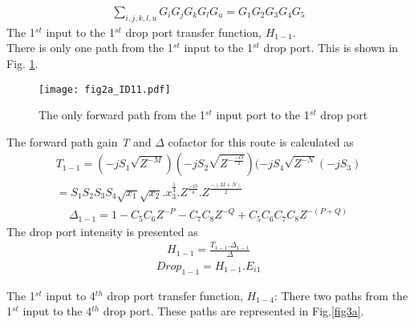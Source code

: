 \documentclass{osa-article}
\begin{document}
\begin{equation}
\begin{split}
\sum_{i,j,k,l,u} {G_i G_j G_kG_lG_u}=G_1G_2G_3G_4G_5 
\label{eqa46}
\end{split}
\end{equation}
The 1$^{st}$ input to the 1$^{st}$ drop port transfer function, $H_{1-1}$.\\

There is only one path from the 1$^{st}$ input to the 1$^{st}$ drop port. This is shown in Fig. \ref{fig2a_ID11}.\\
  \begin{figure}[tb]
\centering
\texttt{[image: fig2a\_ID11.pdf]}
	\caption{The only forward path from the 1$^{st}$ input port to the 1$^{st}$ drop port}
	\label{fig2a_ID11}
\end{figure} 
The forward path gain \textit {T} and $\Delta$ cofactor for this route is calculated as\\
\begin{equation}
\begin{split}
T_{1-1}=(-jS_{1}\sqrt{Z^{-M}})(-jS_{2}\sqrt{Z^{-\frac{-O}{2}}})(-jS_{4}\sqrt{Z^{-N}}(-jS_3)\\
=S_1S_2S_3S_4\sqrt{x_1}\sqrt{x_2}.{x^{\frac{1}{4}}_3}.Z^{\frac{-O}{4}}.Z^{\frac{-(M+N)}{2}}
\label{eqa47}
\end{split}
\end{equation}
\begin{equation}
\begin{split}
\Delta_{1-1}=1-C_5C_6Z^{-P}-C_7C_8Z^{-Q}+C_5C_6C_7C_8Z^{-(P+Q)}
\label{eqa48}
\end{split}
\end{equation}
The drop port intensity is presented as\\
\begin{equation}
\begin{split}
H_{1-1}=\frac{T_{1-1}.\Delta_{1-1}}{\Delta}
\label{eqa49}
\end{split}
\end{equation}
\begin{equation}
\begin{split}
Drop_{1-1}=H_{1-1}.E_{i1}
\label{eqa50}
\end{split}
\end{equation}

The 1$^{st}$ input to 4$^{th}$ drop port transfer function, $H_{1-4}$: 
There two paths from the 1$^{st}$ input to the 4$^{th}$ drop port. These paths are represented in Fig.\ref{fig3a}.
\end{document}
